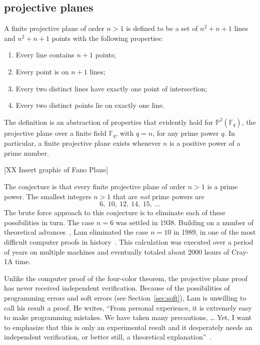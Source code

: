 \documentclass{llncs}
\newcommand{\ring}[1]{\mathbb{#1}}
\begin{document}



\subsection{projective planes}

A finite projective plane of order $n>1$ is defined to be a set of
$n^2 + n + 1$ lines and $n^2 + n+ 1$ points with the following
properties:
\begin{enumerate}
\item Every line contains $n+1$ points;
\item Every point is on $n+1$ lines;
\item Every two distinct lines have exactly one point of intersection;
\item Every two distinct points lie on exactly one line.
\end{enumerate}

The definition is an abstraction of properties that evidently
hold for $\ring{P}^2(\ring{F}_q)$, the projective plane over a finite
field $\ring{F}_q$, with $q=n$, for any prime power $q$.  In
particular, a finite projective plane exists whenever $n$ is a positive power of a prime
number.

[XX Insert graphic of Fano Plane]

The conjecture is that every finite projective plane
of order $n>1$ is a prime power.  The smallest integers $n>1$
that are {\it not} prime powers are
\[
6,~10,~12,~14,~15,~\dots
\]
The brute force approach to this conjecture is to eliminate each of
these possibilities in turn.  The case $n=6$ was settled in 1938.
Building on a number of theoretical advances~\cite{MST}, Lam eliminated the case
$n=10$ in 1989, in one of the most difficult computer proofs in
history~\cite{Lam89}.  This calculation was executed over
a period of years on multiple machines and eventually totaled about 2000
hours of Cray-1A time.  

Unlike the computer proof of the four-color theorem, the
projective plane proof has never received independent verification.
Because of the possibilities of programming errors and soft errors
(see Section~\ref{sec:soft}), Lam is unwilling to call his result a
proof.  He writes, ``From personal experience, it is extremely easy to
make programming mistakes. We have taken many precautions, 
\dots
Yet, I want to emphasize that this is only an
experimental result and it desperately needs an independent
verification, or better still, a theoretical
explanation''~\cite{LamS}.
\end{document}
